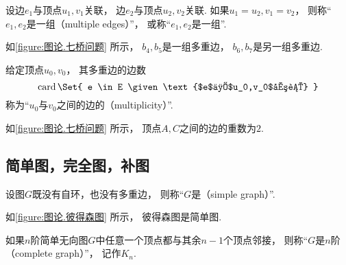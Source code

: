 \begin{figure}[hbt]
	\centering
	\caption{}
	\label{figure:图论.带有自环的无向图}
\end{figure}

\begin{definition}
设边\(e_1\)与顶点\(u_1,v_1\)关联，
边\(e_2\)与顶点\(u_2,v_2\)关联.
如果\(u_1 = u_2,
v_1 = v_2\)，
则称“\(e_1,e_2\)是一组（multiple edges）”，
或称“\(e_1,e_2\)是一组”.
\end{definition}

如\cref{figure:图论.七桥问题} 所示，
\(b_4,b_5\)是一组多重边，
\(b_6,b_7\)是另一组多重边.

\begin{definition}
给定顶点\(u_0,v_0\)，
其多重边的边数\[
	\card\Set{
		e \in E
		\given
		\text{$e$与$u_0,v_0$关联}
	}
\]
称为“\(u_0\)与\(v_0\)之间的边的（multiplicity）”.
\end{definition}

如\cref{figure:图论.七桥问题} 所示，
顶点\(A,C\)之间的边的重数为\(2\).

\subsection{简单图，完全图，补图}
\begin{definition}
设图\(G\)既没有自环，也没有多重边，
则称“\(G\)是（simple graph）”.
\end{definition}

如\cref{figure:图论.彼得森图} 所示，
彼得森图是简单图.

\begin{definition}
如果\(n\)阶简单无向图\(G\)中任意一个顶点都与其余\(n-1\)个顶点邻接，
则称“\(G\)是\(n\)阶（complete graph）”，
记作\(K_n\).
\end{definition}

